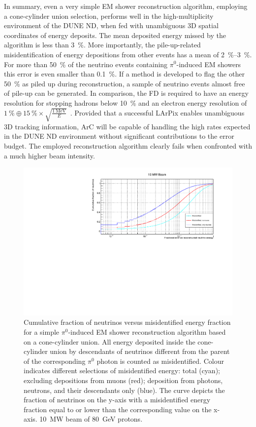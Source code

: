 \documentclass[a4paper]{article}
\begin{document}
In summary, even a very simple EM shower reconstruction algorithm, employing a cone-cylinder union selection, performs well in the high-multiplicity environment of the DUNE ND, when fed with unambiguous 3D spatial coordinates of energy deposits.
The mean deposited energy missed by the algorithm is less than \SI{3}{\percent}.
More importantly, the pile-up-related misidentification of energy depositions from other events has a mean of \SIrange{2}{3}{\percent}.
For more than \SI{50}{\percent} of the neutrino events containing $\pi^0$-induced EM showers this error is even smaller than \SI{0.1}{\percent}.
If a method is developed to flag the other \SI{50}{\percent} as piled up during reconstruction, a sample of neutrino events almost free of pile-up can be generated.
In comparison, the FD is required to have an energy resolution for stopping hadrons below \SI{10}{\percent} and an electron energy resolution of $\SI{1}{\percent} \oplus \SI{15}{\percent} \times \sqrt{\frac{\SI{1}{\mega\electronvolt}}{E}}$~\cite{dune4}.
Provided that a successful LArPix enables unambiguous 3D tracking information, ArC will be capable of handling the high rates expected in the DUNE ND environment without significant contributions to the error budget.
The employed reconstruction algorithm clearly fails when confronted with a much higher beam intensity.

\begin{figure}[tbp]
	\centering
	\includegraphics[width=\textwidth]{Figures/10MW/misid_rel_y}
	\caption{Cumulative fraction of neutrinos versus misidentified energy fraction for a simple $\pi^0$-induced EM shower reconstruction algorithm based on a cone-cylinder union.
		All energy deposited inside the cone-cylinder union by descendants of neutrinos different from the parent of the corresponding $\pi^0$ photon is counted as misidentified.
		Colour indicates different selections of misidentified energy: total (cyan); excluding depositions from muons (red); deposition from photons, neutrons, and their descendants only (blue).
		The curve depicts the fraction of neutrinos on the y-axis with a misidentified energy fraction equal to or lower than the corresponding value on the x-axis.
		\SI{10}{\mega\watt} beam of \SI{80}{\giga\electronvolt} protons.
	}
	\label{fig:dune-nd_10MW_misid-rel-y}
\end{figure}
\end{document}
